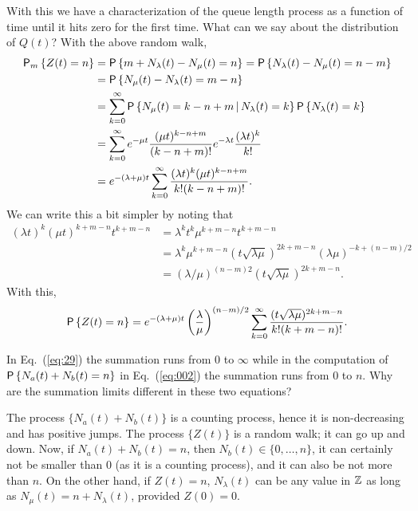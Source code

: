 \begin{question}
\begin{solution}
With this we have a characterization of the queue length process as a
function of time until it hits zero for the first time. What can we
say about the distribution of $Q(t)$? With the above random walk, 
\begin{equation}\label{eq:29}
  \begin{split}
    \P{Z(t)=n}_m
&= \P{m+N_\lambda(t) - N_\mu(t) = n }  = \P{N_\lambda(t) - N_\mu(t) = n-m }  \\
&= \P{N_\mu(t) - N_\lambda(t) = m-n }  \\
&= \sum_{k=0}^\infty \P{N_\mu(t) = k - n + m\given N_\lambda(t) = k } \P{N_\lambda(t)=k}\\
&= \sum_{k=0}^\infty e^{-\mu t} \frac{(\mu t)^{k -n+m}}{(k-n +m)!} e^{-\lambda t} \frac{(\lambda t)^k}{k!} \\
&= e^{-(\lambda+\mu)t} \sum_{k=0}^\infty \frac{(\lambda t)^k(\mu t)^{k  -n + m }}{k!(k-n+m)!}.
  \end{split}
\end{equation}
We can write this a bit simpler by noting that
\begin{equation*}
  \begin{split}
  (\lambda t)^k (\mu t) ^{k + m - n} t^{k+m-n} 
&=  \lambda^k t^k\mu^{k + m - n} t^{k+m-n} \\
&= \lambda^k \mu^{k + m - n} (t\sqrt{\lambda \mu})^{2k+m-n} (\lambda\mu)^{-k + (n-m)/2} \\
&= (\lambda/\mu)^{(n-m)2} (t\sqrt{\lambda \mu})^{2k+m-n}.
  \end{split}
\end{equation*}
With this,
\begin{equation*}
    \P{Z(t)=n} 
= e^{-(\lambda+\mu)t} \left(\frac\lambda\mu\right)^{(n-m)/2} \sum_{k=0}^\infty 
\frac{(t\sqrt{\lambda\mu} )^{2k+m-n}}{k!(k+m-n)!}.
\end{equation*}
  
\end{solution}
\end{question}

\begin{question}
  In Eq.~(\ref{eq:29}) the summation runs from $0$ to $\infty$ while
  in the computation of $\P{N_a(t) + N_b(t)=n}$ in Eq.~(\ref{eq:002})
  the summation runs from $0$ to $n$. Why are the summation limits
  different in these two equations?
  \begin{solution}
    The process $\{N_a(t)+N_b(t)\}$ is a counting process, hence it is
    non-decreasing and has positive jumps.  The process $\{Z(t)\}$ is
    a random walk; it can go up and down. Now, if $N_a(t)+N_b(t)=n$,
    then $N_b(t)\in \{0,\ldots, n\}$, it can certainly not be smaller
    than 0 (as it is a counting process), and it can also be not more
    than $n$. On the other hand, if $Z(t)=n$, $N_\lambda(t)$ can be
    any value in $\mathbb{Z}$ as long as $N_\mu(t)= n+N_\lambda(t)$, provided
    $Z(0)=0$.
  \end{solution}
\end{question}


